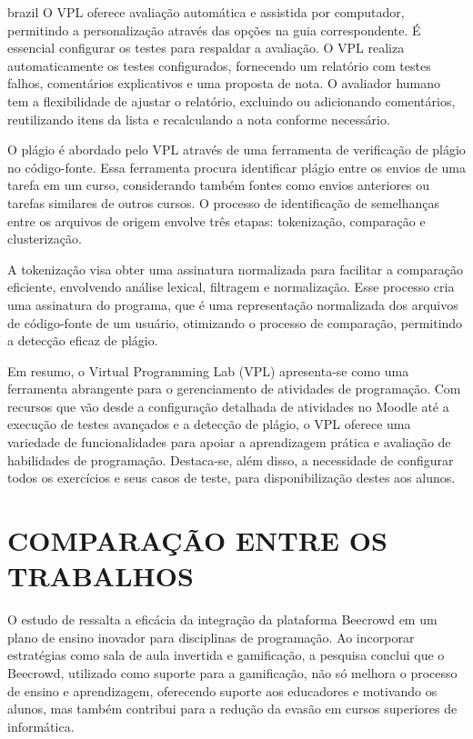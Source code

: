 \begin{otherlanguage*}{brazil}
O VPL oferece avaliação automática e assistida por computador, permitindo a personalização através das opções na guia correspondente. É essencial configurar os testes para respaldar a avaliação. O VPL realiza automaticamente os testes configurados, fornecendo um relatório com testes falhos, comentários explicativos e uma proposta de nota. O avaliador humano tem a flexibilidade de ajustar o relatório, excluindo ou adicionando comentários, reutilizando itens da lista e recalculando a nota conforme necessário.

O plágio é abordado pelo VPL através de uma ferramenta de verificação de plágio no código-fonte. Essa ferramenta procura identificar plágio entre os envios de uma tarefa em um curso, considerando também fontes como envios anteriores ou tarefas similares de outros cursos. O processo de identificação de semelhanças entre os arquivos de origem envolve três etapas: tokenização, comparação e clusterização. 

A tokenização visa obter uma assinatura normalizada para facilitar a comparação eficiente, envolvendo análise lexical, filtragem e normalização. Esse processo cria uma assinatura do programa, que é uma representação normalizada dos arquivos de código-fonte de um usuário, otimizando o processo de comparação, permitindo a detecção eficaz de plágio.

Em resumo, o Virtual Programming Lab (VPL) apresenta-se como uma ferramenta abrangente para o gerenciamento de atividades de programação. Com recursos que vão desde a configuração detalhada de atividades no Moodle até a execução de testes avançados e a detecção de plágio, o VPL oferece uma variedade de funcionalidades para apoiar a aprendizagem prática e avaliação de habilidades de programação. Destaca-se, além disso, a necessidade de configurar todos os exercícios e seus casos de teste, para disponibilização destes aos alunos.

\section{COMPARAÇÃO ENTRE OS TRABALHOS}

O estudo de \cite{cruz2022} ressalta a eficácia da integração da plataforma Beecrowd em um plano de ensino inovador para disciplinas de programação. Ao incorporar estratégias como sala de aula invertida e gamificação, a pesquisa conclui que o Beecrowd, utilizado como suporte para a gamificação, não só melhora o processo de ensino e aprendizagem, oferecendo suporte aos educadores e motivando os alunos, mas também contribui para a redução da evasão em cursos superiores de informática.


\end{otherlanguage*}

